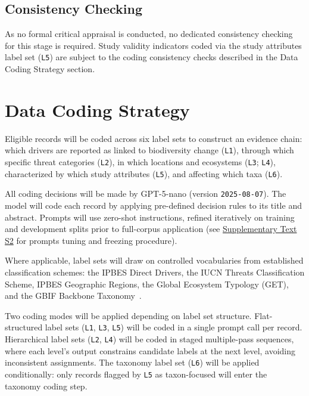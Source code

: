 \documentclass[12pt]{article}
\begin{document}
\subsection*{Consistency Checking}
As no formal critical appraisal is conducted, no dedicated consistency checking for this stage is required. Study validity indicators coded via the study attributes label set (\texttt{L5}) are subject to the coding consistency checks described in the Data Coding Strategy section.

\section*{Data Coding Strategy}


Eligible records will be coded across six label sets to construct an evidence chain: which drivers are reported as linked to biodiversity change (\texttt{L1}), through which specific threat categories (\texttt{L2}), in which locations and ecosystems (\texttt{L3}; \texttt{L4}), characterized by which study attributes (\texttt{L5}), and affecting which taxa (\texttt{L6}).

All coding decisions will be made by GPT-5-nano (version \texttt{2025-08-07}). The model will code each record by applying pre-defined decision rules to its title and abstract. Prompts will use zero-shot instructions, refined iteratively on training and development splits prior to full-corpus application (see \hyperref[sec:prompts_configs]{Supplementary Text S2} for prompts tuning and freezing procedure).

Where applicable, label sets will draw on controlled vocabularies from established classification schemes: the IPBES Direct Drivers, the IUCN Threats Classification Scheme, IPBES Geographic Regions, the Global Ecosystem Typology (GET), and the GBIF Backbone Taxonomy~\cite{diaz_ipbes_2015,iucn_threats_classification_2022,data_ipbes_geo,keith2022function_get,GBIFBackboneTaxonomy_general}.

Two coding modes will be applied depending on label set structure. Flat-structured label sets (\texttt{L1}, \texttt{L3}, \texttt{L5}) will be coded in a single prompt call per record. Hierarchical label sets (\texttt{L2}, \texttt{L4}) will be coded in staged multiple-pass sequences, where each level's output constrains candidate labels at the next level, avoiding inconsistent assignments. The taxonomy label set (\texttt{L6}) will be applied conditionally: only records flagged by \texttt{L5} as taxon-focused will enter the taxonomy coding step. 
\end{document}
